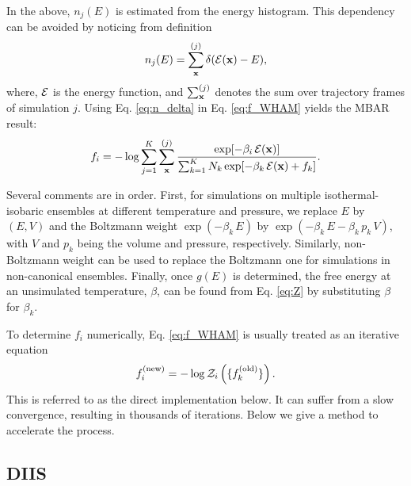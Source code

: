 \documentclass[aip,jcp,preprint,superscriptaddress]{revtex4-1}
\begin{document}
In the above,
$n_j(E)$ is estimated from the energy histogram.
%
This dependency can be avoided
by noticing from definition
%
\begin{equation}
n_j(E)
=
\sum_{\mathbf{x}}^{(j)} \delta(\mathcal{E}(\mathbf{x}) - E),
\label{eq:n_delta}
\end{equation}
%
where,
$\mathcal{E}$
is the energy function,
and
$\sum_{\mathbf{x}}^{(j)}$
denotes the sum over trajectory frames
of simulation $j$.
%
%
%
Using Eq. \eqref{eq:n_delta} in Eq. \eqref{eq:f_WHAM} yields
the MBAR\cite{shirts2008} result:
%
\begin{equation}
f_i
=
-\log
\sum_{j = 1}^K
\sum_{\mathbf{x}}^{(j)}
\frac{
  \exp[-\beta_i \, \mathcal{E}(\mathbf{x})]
}
{
  \sum_{k = 1}^K N_k \exp[-\beta_k \, \mathcal{E}(\mathbf{x}) + f_k]
}.
\label{eq:f_MBAR}
\end{equation}
%



Several comments are in order.
%
First,
for simulations on multiple isothermal-isobaric ensembles
at different temperature and pressure,
%
we replace $E$ by $(E, V)$
and the Boltzmann weight
$\exp(-\beta_k \, E)$
by
$\exp(-\beta_k \, E - \beta_k \, p_k \, V)$,
with
$V$ and $p_k$
being the volume and pressure,
respectively.
%
Similarly,
non-Boltzmann weight\cite{
mezei1987, *berg1992, *lee1993, *tsallis1988}
can be used to replace the Boltzmann one
for simulations in non-canonical ensembles.
%
Finally,
once $g(E)$ is determined,
the free energy at an unsimulated temperature, $\beta$,
can be found from Eq. \eqref{eq:Z}
by substituting $\beta$ for $\beta_k$.


To determine $f_i$ numerically,
Eq. \eqref{eq:f_WHAM}
is usually treated as an iterative equation
%
\begin{equation}
f_i^\mathrm{(new)}
=
-\log \mathcal{Z}_i\left(
  \{ f_k^\mathrm{(old)} \}
\right).
\end{equation}
%
This is referred to as
the direct implementation below.
%
It can suffer from a slow convergence,
resulting in thousands of iterations\cite{
bereau2009, kim2011}.
%
Below we give a method to accelerate the process.





\subsection{DIIS}
\end{document}
